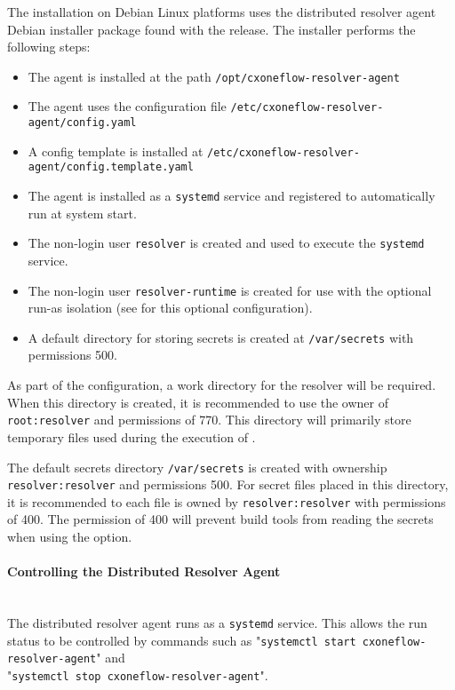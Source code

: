 The installation on Debian Linux platforms uses the distributed resolver agent Debian installer package
found with the \cxoneflow release.  The installer performs the following steps:

\begin{itemize}
  \item The agent is installed at the path \texttt{/opt/cxoneflow-resolver-agent}
  \item The agent uses the configuration file \texttt{/etc/cxoneflow-resolver-agent/config.yaml}
  \item A config template is installed at \texttt{/etc/cxoneflow-resolver-agent/config.template.yaml}
  \item The agent is installed as a \texttt{systemd} service and registered to automatically run at system start.
  \item The non-login user \texttt{resolver} is created and used to execute the \texttt{systemd} service.
  \item The non-login user \texttt{resolver-runtime} is created for use with the optional run-as isolation
    (see  for this optional configuration).
  \item A default directory for storing secrets is created at \texttt{/var/secrets} with permissions 500.
\end{itemize}

As part of the configuration, a work directory for the resolver will be required.  When this directory
is created, it is recommended to use the owner of \texttt{root:resolver} and permissions of 770.  This
directory will primarily store temporary files used during the execution of \scaresolver.

The default secrets directory \texttt{/var/secrets} is created with ownership \texttt{resolver:resolver} and
permissions 500.  For secret files placed in this directory, it is recommended to each file is owned
by \texttt{resolver:resolver} with permissions of 400.  The permission of 400 will prevent 
build tools from reading the secrets when using the  option.

\paragraph{Controlling the Distributed Resolver Agent}
\noindent\\The distributed resolver agent runs as a \texttt{systemd} service.  This allows the run status to be controlled
by commands such as "\texttt{systemctl start cxoneflow-resolver-agent}" and\\"\texttt{systemctl stop cxoneflow-resolver-agent}".

